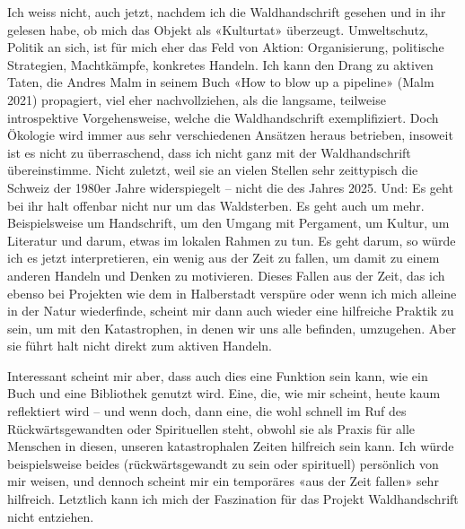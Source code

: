 \documentclass[a4paper,
fontsize=11pt,
oneside,
numbers=noperiodatend,
parskip=half-,
bibliography=totoc,
final
]{scrartcl}
\begin{document}
Ich weiss nicht, auch jetzt, nachdem ich die Waldhandschrift gesehen und
in ihr gelesen habe, ob mich das Objekt als «Kulturtat» überzeugt.
Umweltschutz, Politik an sich, ist für mich eher das Feld von Aktion:
Organisierung, politische Strategien, Machtkämpfe, konkretes Handeln.
Ich kann den Drang zu aktiven Taten, die Andres Malm in seinem Buch «How
to blow up a pipeline» (Malm 2021) propagiert, viel eher nachvollziehen,
als die langsame, teilweise introspektive Vorgehensweise, welche die
Waldhandschrift exemplifiziert. Doch Ökologie wird immer aus sehr
verschiedenen Ansätzen heraus betrieben, insoweit ist es nicht zu
überraschend, dass ich nicht ganz mit der Waldhandschrift übereinstimme.
Nicht zuletzt, weil sie an vielen Stellen sehr zeittypisch die Schweiz
der 1980er Jahre widerspiegelt -- nicht die des Jahres 2025. Und: Es
geht bei ihr halt offenbar nicht nur um das Waldsterben. Es geht auch um
mehr. Beispielsweise um Handschrift, um den Umgang mit Pergament, um
Kultur, um Literatur und darum, etwas im lokalen Rahmen zu tun. Es geht
darum, so würde ich es jetzt interpretieren, ein wenig aus der Zeit zu
fallen, um damit zu einem anderen Handeln und Denken zu motivieren.
Dieses Fallen aus der Zeit, das ich ebenso bei Projekten wie dem in
Halberstadt verspüre oder wenn ich mich alleine in der Natur
wiederfinde, scheint mir dann auch wieder eine hilfreiche Praktik zu
sein, um mit den Katastrophen, in denen wir uns alle befinden,
umzugehen. Aber sie führt halt nicht direkt zum aktiven Handeln.

Interessant scheint mir aber, dass auch dies eine Funktion sein kann,
wie ein Buch und eine Bibliothek genutzt wird. Eine, die, wie mir
scheint, heute kaum reflektiert wird -- und wenn doch, dann eine, die
wohl schnell im Ruf des Rückwärtsgewandten oder Spirituellen steht,
obwohl sie als Praxis für alle Menschen in diesen, unseren
katastrophalen Zeiten hilfreich sein kann. Ich würde beispielsweise
beides (rückwärtsgewandt zu sein oder spirituell) persönlich von mir
weisen, und dennoch scheint mir ein temporäres «aus der Zeit fallen»
sehr hilfreich. Letztlich kann ich mich der Faszination für das Projekt
Waldhandschrift nicht entziehen.
\end{document}

